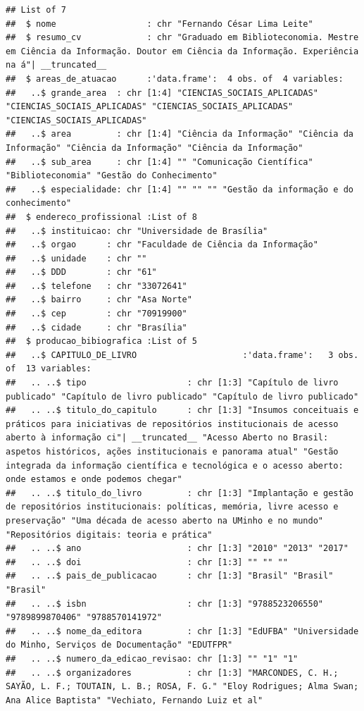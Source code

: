 \documentclass[]{article}
\begin{document}
\begin{verbatim}
## List of 7
##  $ nome                  : chr "Fernando César Lima Leite"
##  $ resumo_cv             : chr "Graduado em Biblioteconomia. Mestre em Ciência da Informação. Doutor em Ciência da Informação. Experiência na á"| __truncated__
##  $ areas_de_atuacao      :'data.frame':  4 obs. of  4 variables:
##   ..$ grande_area  : chr [1:4] "CIENCIAS_SOCIAIS_APLICADAS" "CIENCIAS_SOCIAIS_APLICADAS" "CIENCIAS_SOCIAIS_APLICADAS" "CIENCIAS_SOCIAIS_APLICADAS"
##   ..$ area         : chr [1:4] "Ciência da Informação" "Ciência da Informação" "Ciência da Informação" "Ciência da Informação"
##   ..$ sub_area     : chr [1:4] "" "Comunicação Científica" "Biblioteconomia" "Gestão do Conhecimento"
##   ..$ especialidade: chr [1:4] "" "" "" "Gestão da informação e do conhecimento"
##  $ endereco_profissional :List of 8
##   ..$ instituicao: chr "Universidade de Brasília"
##   ..$ orgao      : chr "Faculdade de Ciência da Informação"
##   ..$ unidade    : chr ""
##   ..$ DDD        : chr "61"
##   ..$ telefone   : chr "33072641"
##   ..$ bairro     : chr "Asa Norte"
##   ..$ cep        : chr "70919900"
##   ..$ cidade     : chr "Brasília"
##  $ producao_bibiografica :List of 5
##   ..$ CAPITULO_DE_LIVRO                     :'data.frame':   3 obs. of  13 variables:
##   .. ..$ tipo                    : chr [1:3] "Capítulo de livro publicado" "Capítulo de livro publicado" "Capítulo de livro publicado"
##   .. ..$ titulo_do_capitulo      : chr [1:3] "Insumos conceituais e práticos para iniciativas de repositórios institucionais de acesso aberto à informação ci"| __truncated__ "Acesso Aberto no Brasil: aspetos históricos, ações institucionais e panorama atual" "Gestão integrada da informação científica e tecnológica e o acesso aberto: onde estamos e onde podemos chegar"
##   .. ..$ titulo_do_livro         : chr [1:3] "Implantação e gestão de repositórios institucionais: políticas, memória, livre acesso e preservação" "Uma década de acesso aberto na UMinho e no mundo" "Repositórios digitais: teoria e prática"
##   .. ..$ ano                     : chr [1:3] "2010" "2013" "2017"
##   .. ..$ doi                     : chr [1:3] "" "" ""
##   .. ..$ pais_de_publicacao      : chr [1:3] "Brasil" "Brasil" "Brasil"
##   .. ..$ isbn                    : chr [1:3] "9788523206550" "9789899870406" "9788570141972"
##   .. ..$ nome_da_editora         : chr [1:3] "EdUFBA" "Universidade do Minho, Serviços de Documentação" "EDUTFPR"
##   .. ..$ numero_da_edicao_revisao: chr [1:3] "" "1" "1"
##   .. ..$ organizadores           : chr [1:3] "MARCONDES, C. H.; SAYÃO, L. F.; TOUTAIN, L. B.; ROSA, F. G." "Eloy Rodrigues; Alma Swan; Ana Alice Baptista" "Vechiato, Fernando Luiz et al"

\end{verbatim}
\end{document}
